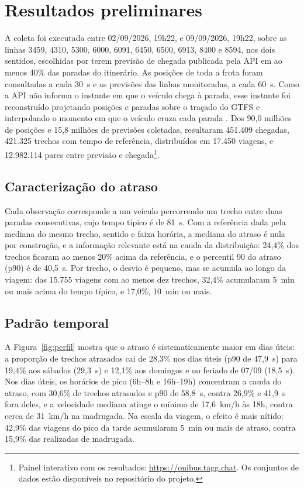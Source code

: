 
\section{Resultados preliminares}
\label{sec:resultados}

A coleta foi executada entre 02/09/2026, 19h22, e 09/09/2026, 19h22, sobre as
linhas 3459, 4310, 5300, 6000, 6091, 6450, 6500, 6913, 8400 e 8594, nos dois
sentidos, escolhidas por terem previsão de chegada publicada pela API em ao
menos 40\% das paradas do itinerário. As posições de toda a frota foram
consultadas a cada 30~s e as previsões das linhas monitoradas, a cada 60~s. Como
a API não informa o instante em que o veículo chega à parada, esse instante foi
reconstruído projetando posições e paradas sobre o traçado do GTFS
\cite{gtfs:2026} e interpolando o momento em que o veículo cruza cada parada
\cite{cathey:2003}. Dos 90,0 milhões de
posições e 15,8 milhões de previsões coletadas, resultaram 451.409 chegadas,
421.325 trechos com tempo de referência, distribuídos em 17.450 viagens, e
12.982.114 pares entre previsão e chegada\footnote{Painel interativo com os
resultados: \url{https://onibus.tagg.chat}. Os conjuntos de dados estão
disponíveis no repositório do projeto.}.

\subsection{Caracterização do atraso}

Cada observação corresponde a um veículo percorrendo um trecho entre duas paradas
consecutivas, cujo tempo típico é de 81~s. Com a referência dada pela mediana do
mesmo trecho, sentido e faixa horária, a mediana do atraso é nula por
construção, e a informação relevante está na cauda da distribuição: 24,4\% dos
trechos ficaram ao menos 20\% acima da referência, e o percentil 90 do atraso
(p90) é de 40,5~s. Por trecho, o desvio é pequeno, mas se acumula ao longo da
viagem: das 15.755 viagens com ao menos dez trechos, 32,4\% acumularam 5~min ou
mais acima do tempo típico, e 17,0\%, 10~min ou mais.

\subsection{Padrão temporal}

A Figura~\ref{fig:perfil} mostra que o atraso é sistematicamente maior em dias
úteis: a proporção de trechos atrasados cai de 28,3\% nos dias úteis (p90 de
47,9~s) para 19,4\% aos sábados (29,3~s) e 12,1\% aos domingos e no feriado de
07/09 (18,5~s). Nos dias úteis, os horários de pico (6h--8h e 16h--19h)
concentram a cauda do atraso, com 30,6\% de trechos atrasados e p90 de 58,8~s,
contra 26,9\% e 41,9~s fora deles, e a velocidade mediana atinge o mínimo de
17,6~km/h às 18h, contra cerca de 31~km/h na madrugada. Na escala da viagem, o
efeito é mais nítido: 42,9\% das viagens do pico da tarde acumularam 5~min ou
mais de atraso, contra 15,9\% das realizadas de madrugada.

